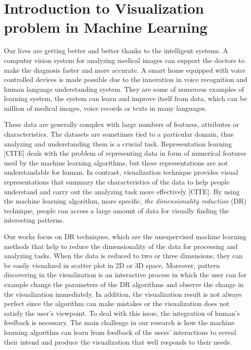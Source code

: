 \section{Introduction to Visualization problem in Machine Learning}

Our lives are getting better and better thanks to the intelligent systems.
A computer vision system for analyzing medical images can support the doctors to make the diagnosis faster and more accurate.
A smart home equipped with voice controlled devices is made possible due to the innovation in voice recognition and human language understanding system.
They are some of numerous examples of learning system, the system can learn and improve itself from data, which can be million of medical images, voice records or texts in many languages.

These data are generally complex with large numbers of features, attributes or characteristics.
The datasets are sometimes tied to a particular domain, thus analyzing and understanding them is a crucial task.
Representation learning [CITE] deals with the problem of representing data in form of numerical features used by the machine learning algorithms, but these representations are not understandable for human.
In contrast, visualization technique provides visual representations that summary the characteristics of the data to help people understand and carry out the analyzing task more effectively [CITE].
By using the machine learning algorithm, more specific, \emph{the dimensionality reduction} (DR) technique, people can access a large amount of data for visually finding the interesting patterns.

Our works focus on DR techniques, which are the unsupervised machine learning methods that help to reduce the dimensionality of the data for processing and analyzing tasks.
When the data is reduced to two or three dimensions, they can be easily visualized in scatter plot in 2D or 3D space.
Moreover, pattern discovering in the visualization is an interactive process in which the user can for example change the parameters of the DR algorithms and observe the change in the visualization immediately.
In addition, the visualization result is not always perfect since the algorithm can make mistakes or the visualization does not satisfy the user's viewpoint. To deal with this issue, the integration of human's feedback is necessary.
The main challenge in our research is how the machine learning algorithm can learn from feedback of the users' interactions to reveal their intend and produce the visualization that well responds to their needs.

